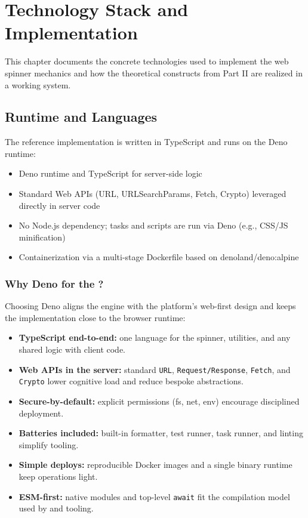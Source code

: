 \chapter{Technology Stack and Implementation}
\label{chap:implementation-tech}

This chapter documents the concrete technologies used to implement the web spinner mechanics and how the theoretical constructs from Part II are realized in a working system.

\section{Runtime and Languages}
The reference implementation is written in TypeScript and runs on the Deno runtime:
\begin{itemize}
	\item Deno runtime and TypeScript for server-side logic
	\item Standard Web APIs (URL, URLSearchParams, Fetch, Crypto) leveraged directly in server code
	\item No Node.js dependency; tasks and scripts are run via Deno (e.g., CSS/JS minification)
	\item Containerization via a multi-stage Dockerfile based on denoland/deno:alpine
\end{itemize}

\subsection{Why Deno for the \webspinner?}
Choosing Deno aligns the engine with the platform’s web-first design and keeps the implementation close to the browser runtime:
\begin{itemize}
	\item \textbf{TypeScript end-to-end:} one language for the spinner, utilities, and any shared logic with client code.
	\item \textbf{Web APIs in the server:} standard \texttt{URL}, \texttt{Request/Response}, \texttt{Fetch}, and \texttt{Crypto} lower cognitive load and reduce bespoke abstractions.
	\item \textbf{Secure-by-default:} explicit permissions (fs, net, env) encourage disciplined deployment.
	\item \textbf{Batteries included:} built-in formatter, test runner, task runner, and linting simplify tooling.
	\item \textbf{Simple deploys:} reproducible Docker images and a single binary runtime keep operations light.
	\item \textbf{ESM-first:} native modules and top-level \texttt{await} fit the compilation model used by \wbll and \wbpl tooling.
\end{itemize}

